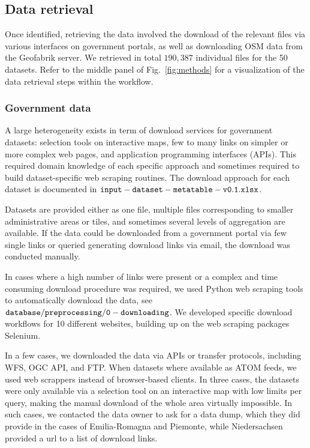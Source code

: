 \documentclass[fleqn,10pt]{wlscirep}
\begin{document}
\subsection*{Data retrieval}

Once identified, retrieving the data involved the download of the relevant files via various interfaces on government portals, as well as downloading OSM data from the Geofabrik server. We retrieved in total $190,387$ individual files for the 50 datasets. Refer to the middle panel of Fig.~\ref{fig:methods} for a visualization of the data retrieval steps within the workflow.


\subsubsection*{Government data}

A large heterogeneity exists in term of download services for government datasets: selection tools on interactive maps, few to many links on simpler or more complex web pages, and  application programming interfaces (APIs). This required domain knowledge of each specific approach and sometimes required to build dataset-specific web scraping routines. The download approach for each dataset is documented in ${\tt input-dataset-metatable-v0.1.xlsx}$. 

Datasets are provided either as one file, multiple files corresponding to smaller administrative areas or tiles, and sometimes several levels of aggregation are available. If the data could be downloaded from a government portal via few single links or queried generating download links via email, the download was conducted manually.

In cases where a high number of links were present or a complex and time consuming download procedure was required, we used Python web scraping tools to automatically download the data, see ${\tt database/preprocessing/0-downloading}$\cite{eubucco-0.1-code2022}. 
We developed specific download workflows for 10 different websites, building up on the web scraping packages Selenium.

In a few cases, we downloaded the data via APIs or transfer protocols, including WFS, OGC API, and FTP. When datasets where available as ATOM feeds, we used web scrappers instead of browser-based clients. 
In three cases, the datasets were only available via a selection tool on an interactive map with low limits per query, making the manual download of the whole area virtually impossible. In such cases, we contacted the data owner to ask for a data dump, which they did provide in the cases of Emilia-Romagna and Piemonte, while Niedersachsen provided a url to a list of download links.  
\end{document}
